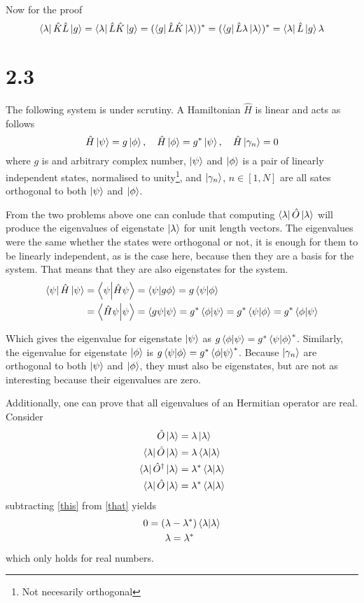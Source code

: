\documentclass{article}
\begin{document}
Now for the proof
\begin{equation}
\bra{\lambda}\hat{K}\hat{L}\ket{g}=\bra{\lambda}\hat{L}\hat{K}\ket{g}=
(\bra{g}\hat{L}\hat{K}\ket{\lambda})^*=(\bra{g}\hat{L}\lambda\ket{\lambda})^*=\bra{\lambda}\hat{L}\ket{g}\lambda
\end{equation}

\section*{2.3}

The following system is under scrutiny. A Hamiltonian $\hat{H}$ is linear and acts as follows
\begin{equation*}
\hat{H}\ket{\psi}=g\ket{\phi}, \quad \hat{H}\ket{\phi}=g^*\ket{\psi}, \quad \hat{H}\ket{\gamma_n}=0
\end{equation*}
where $g$ is and arbitrary complex number, $\ket{\psi}$ and $\ket{\phi}$ is a pair of linearly independent states, normalised to unity\footnote{Not necesarily orthogonal}, and $\ket{\gamma_n}$, $n\in[1,N]$ are all sates orthogonal to both $\ket{\psi}$ and $\ket{\phi}$.

From the two problems above one can conlude that computing $\bra{\lambda}\hat{O}\ket{\lambda}$ will produce the eigenvalues of eigenstate $\ket{\lambda}$ for unit length vectors. The eigenvalues were the same whether the states were orthogonal or not, it is enough for them to be linearly independent, as is the case here, because then they are a basis for the system. That means that they are also eigenstates for the system.
\begin{align}
\bra{\psi}\hat{H}\ket{\psi}&=\braket{\psi}{\hat{H}\psi}=\braket{\psi}{g\phi}=g\braket{\psi}{\phi} \\
&=\braket{\hat{H}\psi}{\psi}=\braket{g\psi}{\psi}=g^*\braket{\phi}{\psi}=g^*\braket{\psi}{\phi}=g^*\braket{\phi}{\psi}
\end{align} 

Which gives the eigenvalue for eigenstate $\ket{\psi}$ as $g\braket{\phi}{\psi}=g^*\braket{\psi}{\phi}^*$. Similarly, the eigenvalue for eigenstate $\ket{\phi}$ is $g\braket{\psi}{\phi}=g^*\braket{\phi}{\psi}^*$. Because $\ket{\gamma_n}$ are orthogonal to both $\ket{\psi}$ and $\ket{\phi}$, they must also be eigenstates, but are not as interesting because their eigenvalues are zero.

Additionally, one can prove that all eigenvalues of an Hermitian operator are real. Consider
\begin{align}
\hat{O}\ket{\lambda} &= \lambda\ket{\lambda} \\
\bra{\lambda}\hat{O}\ket{\lambda} &= \lambda\braket{\lambda}{\lambda} \label{this}\\
\bra{\lambda}\hat{O}^{\dagger}\ket{\lambda} &= \lambda^*\braket{\lambda}{\lambda} \\
\bra{\lambda}\hat{O}\ket{\lambda} &= \lambda^*\braket{\lambda}{\lambda} \label{that}
\end{align}
subtracting \ref{this} from \ref{that} yields
\begin{align}
0=(\lambda&-\lambda^*)\braket{\lambda}\\
\lambda&=\lambda^*
\end{align}
which only holds for real numbers.
\end{document}
